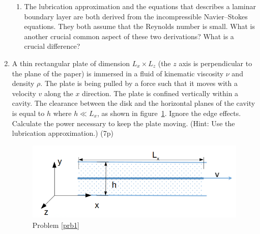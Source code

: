 \documentclass[12pt,a4paper]{article}
\begin{document}
\begin{enumerate}
\begin{enumerate}
  \item The lubrication approximation and the equations that describes a laminar boundary layer are both derived
    from the incompressible Navier--Stokes equations. 
    They both assume  that the Reynolds number is small. 
    What is another crucial common aspect of these two derivations?
    What is a crucial difference?

  \end{enumerate}
  
\item \label{prb1}
  A thin rectangular plate of dimension $L_x\times L_z$
  (the $z$ axis is perpendicular to the plane of the paper)
is immersed in a fluid  of
kinematic viscosity $\nu$ and density $\rho$. The plate is being
pulled by a force such that it moves with a velocity $v$ along the $x$
direction.
The plate is confined vertically within a cavity.
The clearance between the disk and the horizontal planes of the cavity is
equal to $h$ where $h \ll L_x $, as shown in figure~\ref{plate}.
 Ignore the edge effects. 
 Calculate the power necessary to keep the plate moving. 
    (Hint: Use the lubrication approximation.)  (7p)

 \begin{figure}[h]
   \begin{center}
     \includegraphics[width=0.5\linewidth]{plate.png}
   \end{center}
    \caption{\label{plate} Problem \ref{prb1} }
  \end{figure}



\end{enumerate}
\end{document}
